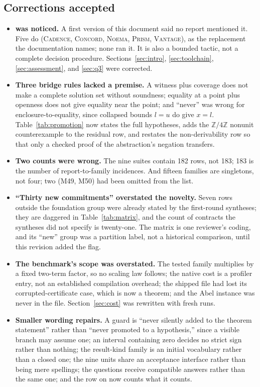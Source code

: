 \documentclass[11pt,a4paper]{article}
\newcommand{\code}[1]{\texttt{\detokenize{#1}}}
\newcommand{\Cd}{\textsc{Cadence}}
\newcommand{\Cc}{\textsc{Concord}}
\newcommand{\Nm}{\textsc{Noema}}
\newcommand{\Pm}{\textsc{Prism}}
\newcommand{\Vt}{\textsc{Vantage}}
\newcommand{\Z}{\mathbb Z}
\theoremstyle{definition}
\begin{document}
\subsection{Corrections accepted}
\begin{itemize}
\item \textbf{\code{grobner} was noticed.} A first version of this document said no report mentioned it. Five do (\Cd, \Cc, \Nm, \Pm, \Vt), as the replacement the \code{polyrith} documentation names; none ran it. It is also a bounded tactic, not a complete decision procedure. Sections~\ref{sec:intro}, \ref{sec:toolchain}, \ref{sec:assessment}, and \ref{sec:q3} were corrected.
\item \textbf{Three bridge rules lacked a premise.} A witness plus coverage does not make a complete solution set without soundness; equality at a point plus openness does not give equality near the point; and ``never'' was wrong for enclosure-to-equality, since collapsed bounds $l=u$ do give $x=l$. Table~\ref{tab:promotion} now states the full hypotheses, adds the $\Z/4\Z$ nonunit counterexample to the residual row, and restates the non-derivability row so that only a checked proof of the abstraction's negation transfers.
\item \textbf{Two counts were wrong.} The nine suites contain 182 rows, not 183; 183 is the number of report-to-family incidences. And fifteen families are singletons, not four; two (M49, M50) had been omitted from the list.
\item \textbf{``Thirty new commitments'' overstated the novelty.} Seven rows outside the foundation group were already stated by the first-round syntheses; they are daggered in Table~\ref{tab:matrix}, and the count of contracts the syntheses did not specify is twenty-one. The matrix is one reviewer's coding, and its ``new'' group was a partition label, not a historical comparison, until this revision added the flag.
\item \textbf{The benchmark's scope was overstated.} The tested family multiplies by a fixed two-term factor, so no scaling law follows; the native cost is a profiler entry, not an established compilation overhead; the shipped file had lost its corrupted-certificate case, which is now a theorem; and the Abel instance was never in the file. Section~\ref{sec:cost} was rewritten with fresh runs.
\item \textbf{Smaller wording repairs.} A guard is ``never silently added to the theorem statement'' rather than ``never promoted to a hypothesis,'' since a visible branch may assume one; an interval containing zero decides no strict sign rather than nothing; the result-kind family is an initial vocabulary rather than a closed one; the nine units share an acceptance interface rather than being mere spellings; the questions receive compatible answers rather than the same one; and the row on \code{polyrith} now counts what it counts.
\end{itemize}
\end{document}

